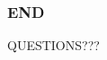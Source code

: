 \documentclass[amssymb,amsmath]{beamer}
\begin{document}
\begin{frame}
\frametitle{END}
QUESTIONS???
\end{frame}

\end{document}
